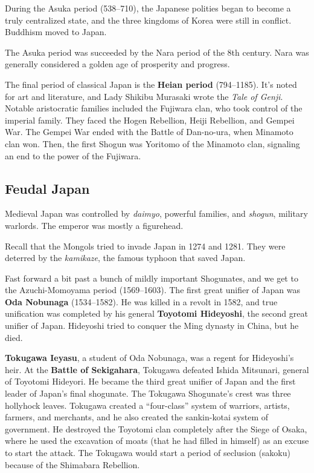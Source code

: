 During the Asuka period (538--710), the Japanese polities began to become a truly centralized state,
and the three kingdoms of Korea were still in conflict.
Buddhism moved to Japan.

The Asuka period was succeeded by the Nara period of the 8th century.
Nara was generally considered a golden age of prosperity and progress.

The final period of classical Japan is the \textbf{Heian period} (794--1185).
It's noted for art and literature, and Lady Shikibu Murasaki wrote the \textit{Tale of Genji}.
Notable aristocratic families included the Fujiwara clan, who took control of the imperial family.
They faced the Hogen Rebellion, Heiji Rebellion, and Gempei War.
The Gempei War ended with the Battle of Dan-no-ura, when Minamoto clan won.
Then, the first Shogun was Yoritomo of the Minamoto clan, signaling an end to the power of the Fujiwara.

\subsection*{Feudal Japan}

Medieval Japan was controlled by \textit{daimyo}, powerful families, and \textit{shogun}, military warlords.
The emperor was mostly a figurehead.

Recall that the Mongols tried to invade Japan in 1274 and 1281.
They were deterred by the \textit{kamikaze}, the famous typhoon that saved Japan.

Fast forward a bit past a bunch of mildly important Shogunates,
and we get to the Azuchi-Momoyama period (1569--1603).
The first great unifier of Japan was \textbf{Oda Nobunaga} (1534--1582).
He was killed in a revolt in 1582,
and true unification was completed by his general \textbf{Toyotomi Hideyoshi},
the second great unifier of Japan.
Hideyoshi tried to conquer the Ming dynasty in China, but he died.

\textbf{Tokugawa Ieyasu}, a student of Oda Nobunaga, was a regent for Hideyoshi's heir.
At the \textbf{Battle of Sekigahara}, Tokugawa defeated Ishida Mitsunari, general of Toyotomi Hideyori.
He became the third great unifier of Japan and the first leader of Japan's final shogunate.
The Tokugawa Shogunate's crest was three hollyhock leaves.
Tokugawa created a ``four-class'' system of warriors, artists, farmers, and merchants,
and he also created the sankin-kotai system of government.
He destroyed the Toyotomi clan completely after the Siege of Osaka,
where he used the excavation of moats (that he had filled in himself) as an excuse to start the attack.
The Tokugawa would start a period of seclusion (sakoku) because of the Shimabara Rebellion.


